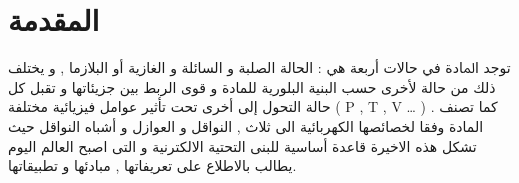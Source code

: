 \chapter*{المقدمة} %

\label{Chapter0} 

\newcommand{\keyword}[1]{\textbf{#1}}
\newcommand{\tabhead}[1]{\textbf{#1}}
\newcommand{\code}[1]{\texttt{#1}}



‫ﺗﻮﺟﺪ ‫اﳌﺎدة‬  ‬في  ‫ﺣﺎﻻت‬ ‫أرﺑﻌﺔ‬ هي : الحالة الصلبة و السائلة و الغازية أو البلازما , و يختلف ذلك من حالة لأخرى حسب البنية البلورية للمادة و قوى الربط بين جزيئاتها و تقبل كل حالة التحول  إلى أخرى تحت تأثير عوامل فيزيائية مختلفة ( P , T , V … ) .
كما تصنف المادة وفقا لخصائصها الكهربائية الى ثلاث , النواقل و العوازل و أشباه النواقل حيث تشكل هذه الاخيرة قاعدة أساسية للبنى التحتية الالكترنية و التى اصبح العالم اليوم يطالب بالاطلاع على  تعريفاتها \cite{2}, مبادئها و تطبيقاتها\cite{1}.

